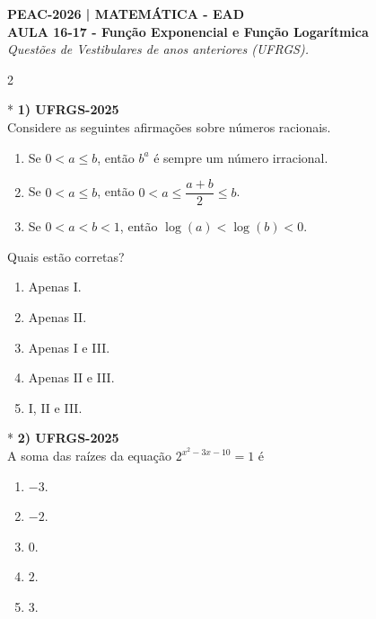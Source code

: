 \documentclass[11pt,a4paper]{article}
\begin{document}
\begin{center}
    \textbf{\Large PEAC-2026 | MATEMÁTICA - EAD} \\[0.2cm]
    \textbf{\large AULA 16-17 - Função Exponencial e Função Logarítmica} \\[0.2cm]
    \textit{Questões de Vestibulares de anos anteriores (UFRGS).}
\end{center}
\vspace{0.5cm}

\begin{paracol}{2}


\switchcolumn[0]*
\textbf{1) UFRGS-2025} \\
Considere as seguintes afirmações sobre números racionais.

\begin{enumerate}[label=\Roman*., itemsep=0.2cm]
    \item Se $0 < a \le b$, então $b^a$ é sempre um número irracional.
    \item Se $0 < a \le b$, então $0 < a \le \dfrac{a+b}{2} \le b$.
    \item Se $0 < a < b < 1$, então $\log(a) < \log(b) < 0$.
\end{enumerate}

Quais estão corretas?

\begin{enumerate}[label=(\Alph*)]
    \item Apenas I.
    \item Apenas II.
    \item Apenas I e III.
    \item Apenas II e III.
    \item I, II e III.
\end{enumerate}
\vspace{0.4cm}

\switchcolumn[1]
\vspace{7cm} 

\switchcolumn[0]*
\textbf{2) UFRGS-2025} \\
A soma das raízes da equação $2^{x^2-3x-10} = 1$ é

\begin{enumerate}[label=(\Alph*)]
    \item $-3$.
    \item $-2$.
    \item $0$.
    \item $2$.
    \item $3$.
\end{enumerate}
\vspace{0.4cm}


\end{paracol}
\end{document}
